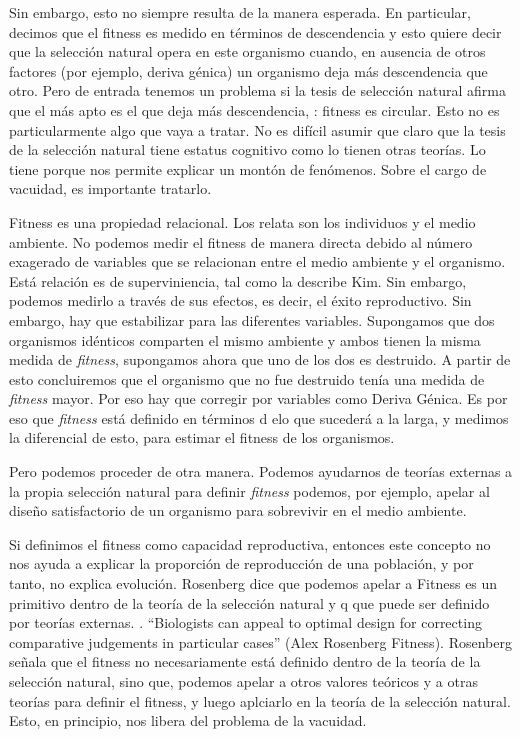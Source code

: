 Sin embargo, esto no siempre resulta de la manera esperada. En particular, decimos que el fitness es medido en términos de descendencia y esto quiere decir que la selección natural opera en este organismo cuando, en ausencia de otros factores (por ejemplo, deriva génica) un organismo deja más descendencia que otro. Pero de entrada tenemos un problema si la tesis de selección natural afirma que el más apto es el que deja más descendencia, : fitness es circular. Esto no es particularmente algo que vaya a tratar. No es difícil asumir que claro que la tesis de la selección natural tiene estatus cognitivo como lo tienen otras teorías. Lo tiene porque nos permite explicar un montón de fenómenos. Sobre el cargo de vacuidad, es importante tratarlo.

Fitness es una propiedad relacional. Los relata son los individuos y el medio ambiente. No podemos medir el fitness de manera directa debido al número exagerado de variables que se relacionan entre el medio ambiente y el organismo. Está relación es de superviniencia, tal como la describe Kim. Sin embargo, podemos medirlo a través de sus efectos, es decir, el éxito reproductivo. Sin embargo, hay que estabilizar para las diferentes variables. Supongamos que dos organismos idénticos comparten el mismo ambiente y ambos tienen la misma medida de \emph{fitness}, supongamos ahora que uno de los dos es destruido. A partir de esto concluiremos que el organismo que no fue destruido tenía una medida de \emph{fitness} mayor. Por eso hay que corregir por variables como Deriva Génica. Es por eso que \emph{fitness} está definido en términos d elo que sucederá a la larga, y medimos la diferencial de esto, para estimar el fitness de los organismos.

Pero podemos proceder de otra manera. Podemos ayudarnos de teorías externas a la propia selección natural para definir \emph{fitness} podemos, por ejemplo, apelar al diseño satisfactorio de un organismo para sobrevivir en el medio ambiente.

Si definimos el fitness como capacidad reproductiva, entonces este concepto no nos ayuda a explicar la proporción de reproducción de una población, y por tanto, no explica evolución. Rosenberg dice que podemos apelar a Fitness es un primitivo dentro de la teoría de la selección natural y q  que puede ser definido por teorías externas. . ``Biologists can appeal to optimal design for correcting comparative judgements in particular cases'' (Alex Rosenberg Fitness). Rosenberg señala que el fitness no necesariamente está definido dentro de la teoría de la selección natural, sino que, podemos apelar a otros valores teóricos y a otras teorías para definir el fitness, y luego aplciarlo en la teoría de la selección natural. Esto, en principio, nos libera del problema de la vacuidad.

